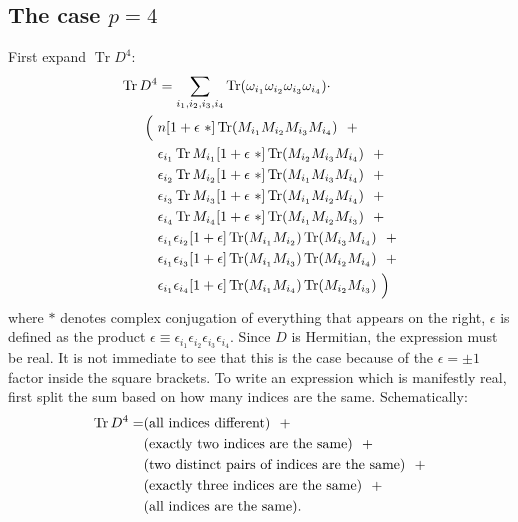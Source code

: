 \documentclass[12pt,a4paper]{article}
\DeclareMathOperator{\Tr}{Tr}
\begin{document}
\subsection{The case $p=4$}
First expand $\Tr D^4$:
\begin{align}\label{eq:trd4}
\Tr D^4 &= \sum_{i_1, i_2, i_3, i_4} \Tr (\omega_{i_1} \omega_{i_2} \omega_{i_3} \omega_{i_4}) \cdot \notag \\
\Big( \ &n [1+\epsilon \ *] \Tr (M_{i_1} M_{i_2} M_{i_3} M_{i_4})  \ \  + \notag \\
&\epsilon_{i_1} \Tr M_{i_1} [1 + \epsilon \ *] \Tr ( M_{i_2} M_{i_3} M_{i_4})  \ \  + \notag \\
&\epsilon_{i_2} \Tr M_{i_2} [1  + \epsilon \ *] \Tr (M_{i_1} M_{i_3} M_{i_4}) \ \  + \notag \\
&\epsilon_{i_3} \Tr M_{i_3} [1 + \epsilon \ *] \Tr (M_{i_1} M_{i_2} M_{i_4})  \ \  + \notag \\
&\epsilon_{i_4} \Tr M_{i_4} [1 + \epsilon \ *] \Tr (M_{i_1} M_{i_2} M_{i_3})  \ \  + \notag \\
&\epsilon_{i_1} \epsilon_{i_2} [1 + \epsilon] \Tr (M_{i_1} M_{i_2} ) \Tr (M_{i_3} M_{i_4})   \ \  + \notag \\
&\epsilon_{i_1} \epsilon_{i_3} [1 + \epsilon] \Tr (M_{i_1} M_{i_3}) \Tr (M_{i_2} M_{i_4})   \ \  + \notag \\
&\epsilon_{i_1} \epsilon_{i_4} [1 + \epsilon] \Tr (M_{i_1} M_{i_4}) \Tr (M_{i_2} M_{i_3})   \ \Big)
\end{align}
where $*$ denotes complex conjugation of everything that appears on the right, $\epsilon$ is defined as the product $\epsilon \equiv \epsilon_{i_1}\epsilon_{i_2}\epsilon_{i_3}\epsilon_{i_4}$. Since $D$ is Hermitian, the expression must be real. It is not immediate to see that this is the case because of the $\epsilon = \pm 1$ factor inside the square brackets.\newline
To write an expression which is manifestly real, first split the sum based on how many indices are the same. Schematically:
\begin{align}
\Tr D^4 = &(\text{all indices different}) \ \ + \notag \\
&(\text{exactly two indices are the same}) \ \ + \notag \\
&(\text{two distinct pairs of indices are the same}) \ \ + \notag \\
&(\text{exactly three indices are the same}) \ \ + \notag \\
&(\text{all indices are the same}).
\end{align}
\end{document}
